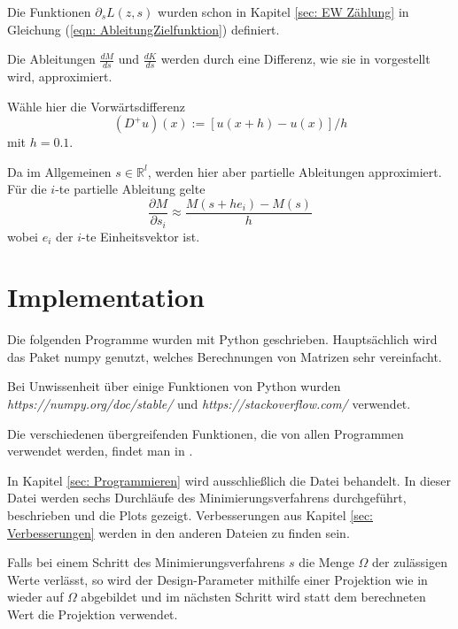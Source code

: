 \documentclass[a4paper,12pt]{report}
\newcommand{\R}{\mathbb R}
\newcommand{\zitat}[1]{\glqq #1\grqq}
\newcommand{\1}{\mathds{1}}
\theoremstyle{plain} %
\theoremstyle{definition} %
\theoremstyle{remark}
\begin{document}
            Die Funktionen $\partial_s L(z, s)$ wurden schon in Kapitel \ref{sec: EW Zählung} in Gleichung (\ref{eqn: AbleitungZielfunktion}) definiert.

            Die Ableitungen $\frac{d M}{d s}$ und $\frac{d K}{d s}$ werden durch eine Differenz, wie sie in \cite[S. 16 f.]{numerikGrossmann} vorgestellt wird, approximiert.

            Wähle hier die Vorwärtsdifferenz
            \begin{equation}
                  \label{def: DiffVerfahren}
                  (D^+u)(x):=[u(x+h)-u(x)]/h
            \end{equation}
            mit $h=0.1$.

            Da im Allgemeinen $s\in \R^l$, werden hier aber partielle Ableitungen approximiert.
            Für die $i$-te partielle Ableitung gelte
            $$\frac{\partial M}{\partial s_i}\approx \frac{M(s+h e_i)-M(s)}{h}$$
            wobei $e_i$ der $i$-te Einheitsvektor ist.
 
      \section{Implementation}
            Die folgenden Programme wurden mit Python geschrieben. Hauptsächlich wird das Paket \zitat{numpy} genutzt, welches Berechnungen von Matrizen sehr vereinfacht.

            Bei Unwissenheit über einige Funktionen von Python wurden \textit{https://numpy.org/doc/stable/} und \textit{https://stackoverflow.com/} verwendet.

            Die verschiedenen übergreifenden Funktionen, die von allen Programmen verwendet werden, findet man in \cite[\textit{./Programmierung/Funktionen.py}]{github}.

            In Kapitel \ref{sec: Programmieren} wird ausschließlich die Datei \cite[\textit{./Programmierung/erste Implementierung.py}]{github} behandelt.
            In dieser Datei werden sechs Durchläufe des Minimierungsverfahrens durchgeführt, beschrieben und die Plots gezeigt.
            Verbesserungen aus Kapitel \ref{sec: Verbesserungen} werden in den anderen Dateien zu finden sein.
            
            Falls bei einem Schritt des Minimierungsverfahrens $s$ die Menge $\Omega$ der zulässigen Werte verlässt,
            so wird der Design-Parameter mithilfe einer Projektion wie in \cite[S. 314]{optimierungJarreProjektion} wieder auf $\Omega$ abgebildet
            und im nächsten Schritt wird statt dem berechneten Wert die Projektion verwendet.
            
\end{document}
